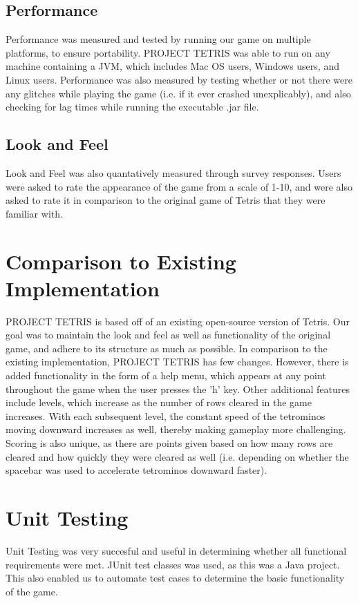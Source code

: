 \documentclass[12pt, titlepage]{article}
\begin{document}
\subsection{Performance}
Performance was measured and tested by running our game on multiple platforms, to ensure portability. PROJECT TETRIS was able to run on any machine containing a JVM, which includes Mac OS users, Windows users, and Linux users. Performance was also measured by testing whether or not there were any glitches while playing the game (i.e. if it ever crashed unexplicably), and also checking for lag times while running the executable .jar file.
\subsection{Look and Feel}
Look and Feel was also quantatively measured through survey responses. Users were asked to rate the appearance of the game from a scale of 1-10, and were also asked to rate it in comparison to the original game of Tetris that they were familiar with.

\section{Comparison to Existing Implementation}	
PROJECT TETRIS is based off of an existing open-source version of Tetris. Our goal was to maintain the look and feel as well as functionality of the original game, and adhere to its structure as much as possible. In comparison to the existing implementation, PROJECT TETRIS has few changes. However, there is added functionality in the form of a help menu, which appears at any point throughout the game when the user presses the 'h' key. Other additional features include levels, which increase as the number of rows cleared in the game increases. With each subsequent level, the constant speed of the tetrominos moving downward increases as well, thereby making gameplay more challenging. Scoring is also unique, as there are points given based on how many rows are cleared and how quickly they were cleared as well (i.e. depending on whether the spacebar was used to accelerate tetrominos downward faster).
\section{Unit Testing}
Unit Testing was very succesful and useful in determining whether all functional requirements were met. JUnit test classes was used, as this was a Java project. This also enabled us to automate test cases to determine the basic functionality of the game.
\end{document}
